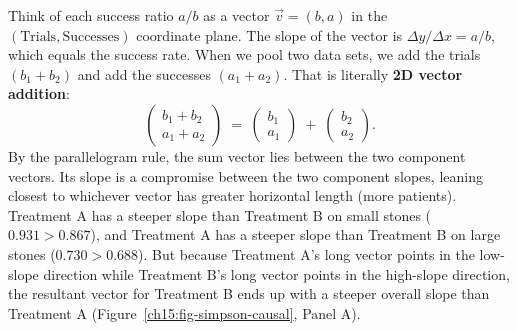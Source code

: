 \begin{intuitionbox}
Think of each success ratio $a/b$ as a vector $\vec{v} = (b, a)$ in the $(\text{Trials}, \text{Successes})$ coordinate plane. The slope of the vector is $\Delta y / \Delta x = a/b$, which equals the success rate.
When we pool two data sets, we add the trials $(b_1 + b_2)$ and add the successes $(a_1 + a_2)$. That is literally \textbf{2D vector addition}:
\[
  \begin{pmatrix} b_1 + b_2 \\ a_1 + a_2 \end{pmatrix}
  \;=\; \begin{pmatrix} b_1 \\ a_1 \end{pmatrix} \;+\; \begin{pmatrix} b_2 \\ a_2 \end{pmatrix}.
\]
By the parallelogram rule, the sum vector lies between the two component vectors. Its slope is a compromise between the two component slopes, leaning closest to whichever vector has greater horizontal length (more patients).
Treatment A has a steeper slope than Treatment B on small stones ($0.931 > 0.867$), and Treatment A has a steeper slope than Treatment B on large stones ($0.730 > 0.688$). But because Treatment A's long vector points in the low-slope direction while Treatment B's long vector points in the high-slope direction, the resultant vector for Treatment B ends up with a steeper overall slope than Treatment A (Figure~\ref{ch15:fig-simpson-causal}, Panel A).
\end{intuitionbox}

